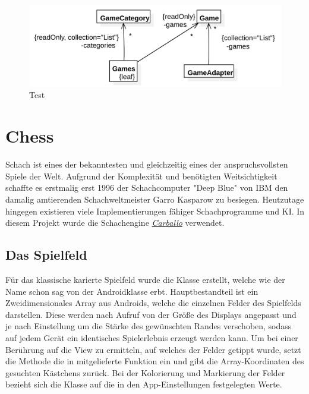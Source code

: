 \begin{figure}[h]
	\centering
	\includegraphics{resources/gamemanager/gamemanager_uml}
	\caption{Test}
	\label{fig:gm_uml}
\end{figure}

\section{Chess}
\sectionauthor{\oliver}

Schach ist eines der bekanntesten und gleichzeitig eines der anspruchsvollsten
Spiele der Welt. Aufgrund der Komplexität und benötigten Weitsichtigkeit
schaffte es erstmalig erst 1996 der Schachcomputer "Deep Blue" von IBM den
damalig amtierenden Schachweltmeister Garro Kasparow zu besiegen.
 Heutzutage hingegen existieren viele Implementierungen
fähiger Schachprogramme und KI. In diesem Projekt wurde die Schachengine
\hyperlink{https://github.com/albertoruibal/carballo}{\emph{Carballo}}
verwendet.  

\subsection{Das Spielfeld}

Für das klassische karierte Spielfeld wurde die Klasse
 erstellt, welche wie der Name schon sag von der
Androidklasse  erbt. Hauptbestandteil ist ein Zweidimensionales
Array aus Androids, welche die einzelnen Felder des Spielfelds
darstellen. Diese werden nach Aufruf von  der Größe des
Displays angepasst und je nach Einstellung um die Stärke des gewünschten Randes
verschoben, sodass auf jedem Gerät ein identisches Spielerlebnis erzeugt werden
kann. Um bei einer Berührung auf die View zu ermitteln, auf welches der Felder
getippt wurde, setzt die Methode  die in
 mitgelieferte Funktion  ein und gibt
die Array-Koordinaten des gesuchten Kästchens zurück. Bei der Kolorierung und
Markierung der Felder bezieht sich die Klasse auf die in den App-Einstellungen
festgelegten Werte.

